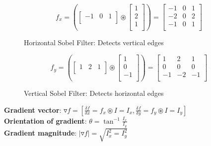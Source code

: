 \documentclass[12pt]{article}
\begin{document}
\begin{figure}[!h]
\begin{minipage}[t]{0.5\linewidth}
\centering
\begin{equation*}
f_x = 
(\begin{bmatrix}
-1 & 0 & 1\\
\end{bmatrix} \circledast 
\begin{bmatrix}
1 \\
2 \\
1 \\
\end{bmatrix} ) = 
\begin{bmatrix}
-1 & 0 & 1\\
-2 & 0 & 2\\
-1 & 0 & 1\\
\end{bmatrix}
\end{equation*}
\caption*{Horizontal Sobel Filter: Detects vertical edges}
\end{minipage}
\begin{minipage}[t]{0.5\linewidth}
\centering
\begin{equation*}
f_y = 
(\begin{bmatrix}
1 & 2 & 1\\
\end{bmatrix} \circledast 
\begin{bmatrix}
1 \\
0 \\
-1 \\
\end{bmatrix} ) = 
\begin{bmatrix}
1 & 2 & 1\\
0 & 0 & 0\\
-1 & -2 & -1\\
\end{bmatrix}
\end{equation*}
\caption*{Vertical Sobel Filter: Detects horizontal edges}
\end{minipage}
\end{figure}

\textbf{Gradient vector}: $\triangledown f = [\frac{\delta f}{\delta x} = f_x \circledast I = I_x, \frac{\delta f}{\delta y} = f_y \circledast I = I_y] $\\

\textbf{Orientation of gradient}: $\theta = \tan^{-1} \frac{I_x}{I_y}$\\

\textbf{Gradient magnitude}: $|\triangledown f | = \sqrt{I_x^2 = I_y^2}$
\end{document}
